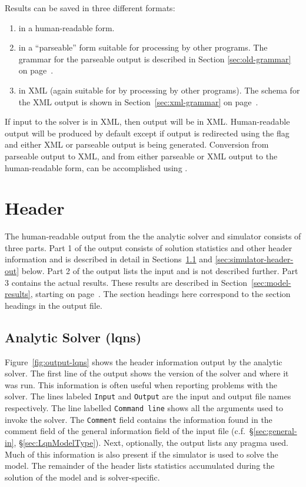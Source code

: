 Results can be saved in three different formats:
\begin{enumerate}
\item in a human-readable form.
\item in a ``parseable'' form suitable for
  processing by other programs.  The grammar for the parseable output
  is described in Section \ref{sec:old-grammar} on
  page~\pageref{sec:old-grammar}.
\item in XML (again suitable for by processing by
  other programs).  The schema for the XML output is shown in
  Section~\ref{sec:xml-grammar} on page~\pageref{sec:xml-grammar}.
\end{enumerate}
If input to the solver is in XML, then output will be
in XML.  Human-readable output will be
produced by default except if output is redirected using the
 flag and either XML or parseable output is being
generated.  Conversion from parseable output
to XML, and from either parseable or XML output to the human-readable
form, can be accomplished using .

\section{Header}

The human-readable output from the the analytic solver and simulator
consists of three parts.  Part 1 of the output consists of solution
statistics and other header information and is described in detail in
Sections~\ref{sec:analytic-header-out} and
\ref{sec:simulator-header-out} below.  Part 2 of the output lists the
input and is not described further.  Part 3 contains the actual
results.  These results are described in
Section~\ref{sec:model-results}, starting on
page~\pageref{sec:model-results}.  The section headings here
correspond to the section headings in the output file.

\subsection{Analytic Solver (lqns)}
\label{sec:analytic-header-out}

Figure~\ref{fig:output-lqns} shows the header information output by
the analytic solver.  The first line of the output shows the version
of the solver and where it was run.  This information is often useful
when reporting problems with the solver.  The lines labeled
\texttt{Input} and \texttt{Output} are the input and output file names
respectively.  The line labelled \texttt{Command line} shows all the
arguments used to invoke the solver.  The \texttt{Comment} field
contains the information found in the comment field of the general
information field of the input file (c.f.~\S\ref{sec:general-in},
\S\ref{sec:LqnModelType}).  Next, optionally, the output lists any
pragma used.  Much of this information is also present if the
simulator is used to solve the model.  The remainder of the header
lists statistics accumulated during the solution of the model and is
solver-specific.

